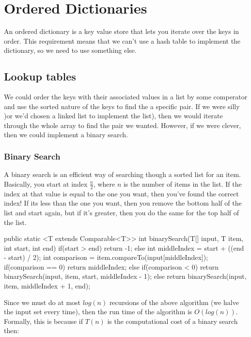 \section{Ordered Dictionaries}

An ordered dictionary is a key value store that lets you iterate over the keys
in order. This requirement means that we can't use a hash table to implement the
dictionary, so we need to use something else.

\subsection{Lookup tables}

We could order the keys with their associated values in a list by some
comperator and use the sorted nature of the keys to find the a specific pair. If
we were silly )or we'd chosen a linked list to implement the list), then we
would iterate through the whole array to find the pair we wanted. However, if we
were clever, then we could implement a binary search.

\subsubsection{Binary Search}

A binary search is an efficient way of searching though a sorted list for an
item. Basically, you start at index $\frac{n}{2}$, where $n$ is the number of
items in the list. If the index at that value is equal to the one you want, then
you've found the correct index! If its less than the one you want, then you
remove the bottom half of the list and start again, but if it's greater, then
you do the same for the top half of the list.

\begin{javacode}
  public static <T extends Comparable<T>> int binarySearch(T[] input, T item,
                                                           int start, int end) {
    if(start > end) return -1;
    else {
      int middleIndex = start + ((end - start) / 2);
      int comparison = item.compareTo(input[middleIndex]);
      if(comparison == 0) {
        return middleIndex;
      } else if(comparison < 0) {
        return binarySearch(input, item, start, middleIndex - 1);
      } else {
        return binarySearch(input, item, middleIndex + 1, end);
      }
    }
  }
\end{javacode}

Since we must do at most $log(n)$ recursions of the above algorithm (we halve
the input set every time), then the run time of the algorithm is $O(log(n))$.
Formally, this is because if $T(n)$ is the computational cost of a binary search
then:

